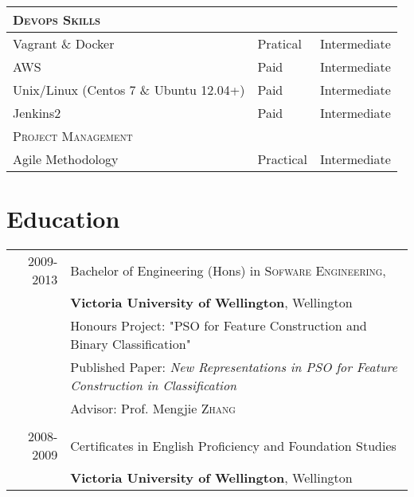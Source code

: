 \documentclass[a4paper,10pt]{article} %
\begin{document}
\begin{tabular}{l|l|l}
    \hline
    \textsc{Devops Skills} \\ \hline
    Vagrant \& Docker & Pratical & Intermediate \\ 
    AWS & Paid & Intermediate \\ 
    Unix/Linux (Centos 7 \& Ubuntu 12.04+) & Paid & Intermediate \\ 
    Jenkins2 & Paid & Intermediate \\ 
    \hline
    \textsc{Project Management}\\ \hline
    Agile Methodology & Practical & Intermediate \\ 
    \end{tabular}



\section{Education}
\begin{tabular}{rl} 

\textsc{2009-2013} & Bachelor of Engineering (Hons) in \textsc{Sofware Engineering},\\
&\textbf{Victoria University of Wellington}, Wellington\\
& Honours Project: "PSO for Feature Construction and Binary Classification" \\
& Published Paper: \emph{New Representations in PSO for Feature Construction in Classification}\\
& \small Advisor: Prof. Mengjie \textsc{Zhang}\\
& \\


\textsc{2008-2009} & Certificates in English Proficiency and Foundation Studies\\
&\textbf{Victoria University of Wellington}, Wellington\\
\end{tabular}


\end{document}
